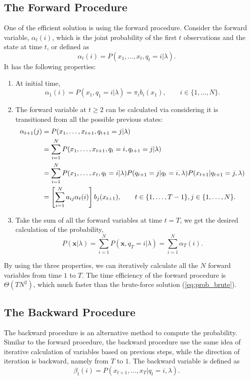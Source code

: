 \documentclass[12pt,final,twoside]{report}
\begin{document}
\subsection{The Forward Procedure}
One of the efficient solution is using the forward procedure. Consider the forward variable, $\alpha_t(i)$, which is the joint probability of the first $t$ observations and the state at time $t$, or defined as
\begin{equation}
  \alpha_t(i) = P(x_1,\dots,x_t,q_t=i|\lambda) .
\end{equation}
It has the following properties:
\begin{enumerate}
  \item At initial time,
    \begin{equation}
      \alpha_1(i) = P(x_1,q_1=i|\lambda) = \pi_i b_i(x_1), \qquad i \in \{1,\dots,N\} .
    \end{equation}
  \item The forward variable at $t \geq 2$ can be calculated via considering it is transitioned from all the possible previous states:
    \begin{align}
      \alpha_{t+1}(j) &= P(x_1,\dots,x_{t+1},q_{t+1}=j|\lambda) \notag\\
      &= \sum_{i=1}^{N} P(x_1,\dots,x_{t+1},q_t=i,q_{t+1}=j|\lambda) \notag\\
      &= \sum_{i=1}^{N} P(x_1,\dots,x_t,q_t=i|\lambda) P(q_{t+1}=j|q_t=i,\lambda) P(x_{t+1}|q_{t+1}=j,\lambda) \notag\\
      &= \left[ \sum_{i=1}^{N} a_{ij} \alpha_t(i) \right] b_j(x_{t+1}), \qquad t \in \{1,\dots,T - 1\}, j \in \{1,\dots,N\} .
    \end{align}
  \item Take the sum of all the forward variables at time $t = T$, we get the desired calculation of the probability,
    \begin{equation}
      P(\mathbf{x}|\lambda) = \sum_{i=1}^N P(\mathbf{x},q_T=i|\lambda) = \sum_{i=1}^N \alpha_T(i) .
    \end{equation}
\end{enumerate}

By using the three properties, we can iteratively calculate all the $N$ forward variables from time $1$ to $T$. The time efficiency of the forward procedure is $\Theta(TN^2)$, which much faster than the brute-force solution (\cref{eq:prob_brute}).

\subsection{The Backward Procedure}
The backward procedure is an alternative method to compute the probability. Similar to the forward procedure, the backward procedure use the same idea of iterative calculation of variables based on previous steps, while the direction of iteration is backward, namely from $T$ to $1$. The backward variable is defined as
\begin{equation}
  \beta_t(i) = P(x_{t+1},\dots,x_T|q_t=i,\lambda) .
\end{equation}
\end{document}
